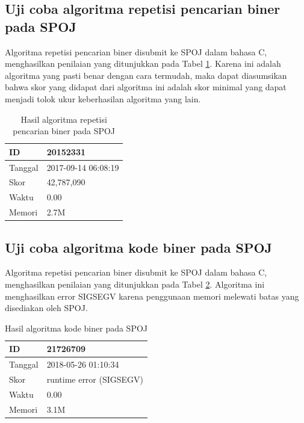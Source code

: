 \subsection{Uji coba algoritma repetisi pencarian biner pada SPOJ}

Algoritma repetisi pencarian biner disubmit ke SPOJ dalam bahasa C, menghasilkan penilaian yang ditunjukkan pada Tabel \ref{tab:score_repetitive}. Karena ini adalah algoritma yang pasti benar dengan cara termudah, maka dapat diasumsikan bahwa skor yang didapat dari algoritma ini adalah skor minimal yang dapat menjadi tolok ukur keberhasilan algoritma yang lain.

\begin{table}[h!]
\caption{Hasil algoritma repetisi pencarian biner pada SPOJ}
\label{tab:score_repetitive}
\begin{center}
\begin{tabular} {|l|l|}
\hline
ID & 20152331 \\ \hline
Tanggal & 2017-09-14 06:08:19 \\ \hline
Skor & 42,787,090 \\ \hline
Waktu & 0.00 \\ \hline
Memori & 2.7M \\ \hline
\end{tabular}
\end{center}
\end{table}


\subsection{Uji coba algoritma kode biner pada SPOJ}

Algoritma repetisi pencarian biner disubmit ke SPOJ dalam bahasa C, menghasilkan penilaian yang ditunjukkan pada Tabel \ref{tab:score_brute_binary_code}. Algoritma ini menghasilkan error SIGSEGV karena penggunaan memori melewati batas yang disediakan oleh SPOJ.

\begin{table}[h!]
\caption{Hasil algoritma kode biner pada SPOJ}
\label{tab:score_brute_binary_code}
\begin{center}
\begin{tabular} {|l|l|}
\hline
ID & 21726709 \\ \hline
Tanggal & 2018-05-26 01:10:34 \\ \hline
Skor & runtime error (SIGSEGV) \\ \hline
Waktu & 0.00 \\ \hline
Memori & 3.1M \\ \hline
\end{tabular}
\end{center}
\end{table}


